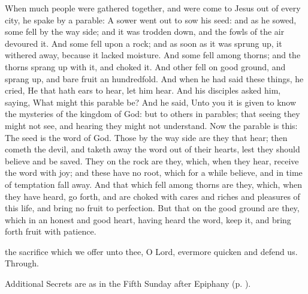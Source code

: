  When much people were gathered together, and were come to Jesus out of every city, he spake by a parable: A sower went out to sow his seed: and as he sowed, some fell by the way side; and it was trodden down, and the fowls of the air devoured it. And some fell upon a rock; and as soon as it was sprung up, it withered away, because it lacked moisture. And some fell among thorns; and the thorns sprang up with it, and choked it. And other fell on good ground, and sprang up, and bare fruit an hundredfold. And when he had said these things, he cried, He that hath ears to hear, let him hear. And his disciples asked him, saying, What might this parable be? And he said, Unto you it is given to know the mysteries of the kingdom of God: but to others in parables; that seeing they might not see, and hearing they might not understand. Now the parable is this: The seed is the word of God. Those by the way side are they that hear; then cometh the devil, and taketh away the word out of their hearts, lest they should believe and be saved. They on the rock are they, which, when they hear, receive the word with joy; and these have no root, which for a while believe, and in time of temptation fall away. And that which fell among thorns are they, which, when they have heard, go forth, and are choked with cares and riches and pleasures of this life, and bring no fruit to perfection. But that on the good ground are they, which in an honest and good heart, having heard the word, keep it, and bring forth fruit with patience.

\vspace{-3ex}

\secret
{} the sacrifice which we offer unto thee, O Lord, evermore quicken and defend us. Through.
\begin{rubric}
    Additional Secrets are as in the Fifth Sunday after Epiphany (p. \pageref{EpiphanyVSecret}).
\end{rubric}

